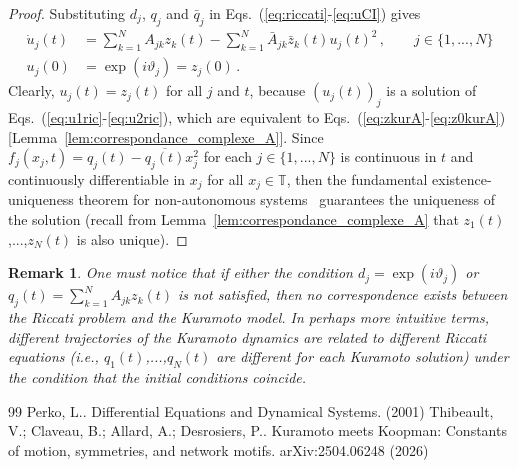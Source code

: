 \documentclass[10pt,a4paper]{amsart}
\newtheorem{lemma}{Lemma}
\newtheorem{remark}[theorem]{Remark}
\begin{document}
\begin{proof}
    Substituting $d_j$, $q_j$ and $\bar{q}_j$ in Eqs.~(\ref{eq:riccati}-\ref{eq:uCI}) gives
    \begin{align}
        \dot{u}_j(t) &= \sum_{k=1}^N A_{jk}z_k(t)  - \sum_{k=1}^N \bar{A}_{jk}\bar{z}_k(t)u_j(t)^2\,, \qquad j\in\{1,...,N\}\label{eq:u1ric}\\
        u_j(0) &= \exp(i\vartheta_j) = z_j(0)\label{eq:u2ric}\,.
    \end{align} 
    Clearly, $u_j(t) = z_j(t)$ for all $j$ and $t$, because $(u_j(t))_j$ is a solution of Eqs.~(\ref{eq:u1ric}-\ref{eq:u2ric}), which are equivalent to Eqs.~(\ref{eq:zkurA}-\ref{eq:z0kurA}) [Lemma~\ref{lem:correspondance_complexe_A}]. Since $f_j(x_j, t) = q_j(t) - \overline{q_j(t)}x_j^2$ for each $j\in\{1, ..., N\}$ is continuous in $t$ and continuously differentiable in $x_j$ for all $x_j\in\mathbb{T}$, then the fundamental existence-uniqueness theorem for non-autonomous systems~\cite[p.77]{Perko2001} guarantees the uniqueness of the solution (recall from Lemma~\ref{lem:correspondance_complexe_A} that $z_1(t)$,...,$z_N(t)$ is also unique).
\end{proof}

\begin{remark}
    One must notice that if either the condition $d_j = \exp(i\vartheta_j)$ or $q_j(t) = \textstyle{\sum_{k=1}^N} A_{jk}z_k(t)$ is not satisfied, then no correspondence exists between the Riccati problem and the Kuramoto model. In perhaps more intuitive terms, different trajectories of the Kuramoto dynamics are related to different Riccati equations (i.e., $q_1(t)$,...,$q_N(t)$ are different for each Kuramoto solution) under the condition that the initial conditions coincide.
\end{remark}

\begin{thebibliography}{99}
 Perko, L.. Differential Equations and Dynamical Systems. (2001)
 Thibeault, V.; Claveau, B.; Allard, A.; Desrosiers, P.. Kuramoto meets Koopman: Constants of motion, symmetries, and network motifs. arXiv:2504.06248 (2026)
\end{thebibliography}
\end{document}
